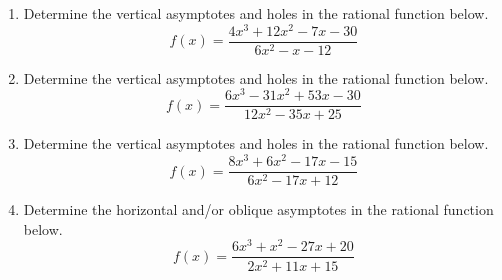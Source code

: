 \documentclass[14pt]{extbook}
\begin{document}
\begin{enumerate}
\item{
Determine the vertical asymptotes and holes in the rational function below.\[ f(x) = \frac{4x^{3} +12 x^{2} -7 x -30}{6x^{2} -x -12} \]} \newpage
\item{
Determine the vertical asymptotes and holes in the rational function below.\[ f(x) = \frac{6x^{3} -31 x^{2} +53 x -30}{12x^{2} -35 x + 25} \]} \newpage
\item{
Determine the vertical asymptotes and holes in the rational function below.\[ f(x) = \frac{8x^{3} +6 x^{2} -17 x -15}{6x^{2} -17 x + 12} \]} \newpage
\item{
Determine the horizontal and/or oblique asymptotes in the rational function below.\[ f(x) = \frac{6x^{3} + x^{2} -27 x + 20}{2x^{2} +11 x + 15} \]} \newpage
\end{enumerate}
\end{document}
